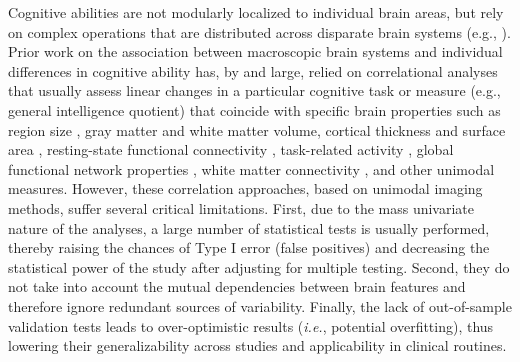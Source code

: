 \documentclass[10pt,letterpaper]{article}
\begin{document}
Cognitive abilities are not modularly localized to individual brain areas, but rely on complex operations that are distributed across disparate brain systems (e.g., \cite{Petersen2015}). Prior work on the association between macroscopic brain systems and individual differences in cognitive ability has, by and large, relied on correlational analyses that usually assess linear changes in a particular cognitive task or measure (e.g., general intelligence quotient) that coincide with specific brain properties such as region size \cite{haier_structural_2004, FLASHMAN1997149}, gray matter \cite{ZIMMERMAN2006823} and white matter \cite{posthuma} volume, cortical thickness \cite{10.1093/cercor/bhl125} and surface area \cite{schnack_changes_2015}, resting-state functional connectivity \cite{SHEN2018878}, task-related activity \cite{WAGER2005323}, global functional network properties \cite{vandenHeuvel7619}, white matter connectivity \cite{Li2009}, and other unimodal measures. However, these correlation approaches, based on unimodal imaging methods, suffer several critical limitations. First, due to the mass univariate nature of the analyses, a large number of statistical tests is usually performed, thereby raising the chances of Type I error (false positives) and decreasing the statistical power of the study after adjusting for multiple testing. Second, they do not take into account the mutual dependencies between brain features and therefore ignore redundant sources of variability. Finally, the lack of out-of-sample validation tests leads to over-optimistic results ({\it i.e.}, potential overfitting), thus lowering their generalizability across studies and applicability in clinical routines.
\end{document}
